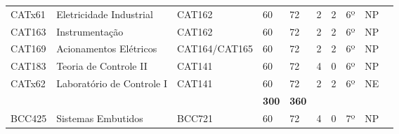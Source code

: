 \begin{table}[]
{\begin{tabular}{l|l|l|l|l|l|l|l|l|l}
			\multicolumn{1}{|l|}{CATx61}                        & Eletricidade Industrial                                  & CAT162                        & 60                                                           & 72                         & 2                        & 2                         & 6º                         & NP                      &  \\ \cline{1-9}
			\multicolumn{1}{|l|}{CAT163}                        & Instrumentação                                           & CAT162                        & 60                                                           & 72                         & 2                        & 2                         & 6º                         & NP                      &  \\ \cline{1-9}
			\multicolumn{1}{|l|}{CAT169}                        & Acionamentos Elétricos                                   & CAT164/CAT165                 & 60                                                           & 72                         & 2                        & 2                         & 6º                         & NP                      &  \\ \cline{1-9}
			\multicolumn{1}{|l|}{CAT183}                        & Teoria de Controle II                                    & CAT141                        & 60                                                           & 72                         & 4                        & 0                         & 6º                         & NP                      &  \\ \cline{1-9}
			\multicolumn{1}{|l|}{CATx62}                        & Laboratório de Controle I                                & CAT141                        & 60                                                           & 72                         & 2                        & 2                         & 6º                         & NE                      &  \\ \cline{1-9}
			\multicolumn{1}{|l|}{}                              &                                                          &                               & \textbf{300}                                                 & \textbf{360}               &                          &                           &                            &                         &  \\ \cline{1-9}
			BCC425                                              & Sistemas Embutidos                                       & BCC721                        & 60                                                           & 72                         & 4                        & 0                         & 7º                         & NP                      &  \\ \cline{1-9}

\end{tabular}}
\end{table}
